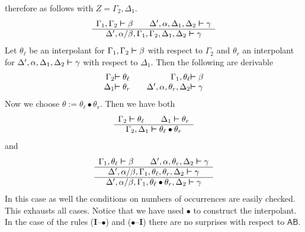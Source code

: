 therefore as follows with $Z = \Gamma_2, \Delta_1$.
\begin{equation}
\begin{array}{c}
\Gamma_1, \Gamma_2 \boldsymbol{\vdash} \beta \qquad \Delta', \alpha,
\Delta_1, \Delta_2 \boldsymbol{\vdash} \gamma \\\hline
\Delta', \alpha/\beta, \Gamma_1, \Gamma_2, \Delta_1,
\Delta_2 \boldsymbol{\vdash} \gamma
\end{array}
\end{equation}
Let $\theta_{\ell}$ be an interpolant for $\Gamma_1, \Gamma_2 %
\bvdash \beta$ with respect to $\Gamma_2$ and $\theta_r$ an
interpolant for $\Delta', \alpha, \Delta_1, \Delta_2 \boldsymbol{\vdash} \gamma$
with respect to $\Delta_1$. Then the following are derivable
\begin{equation}
\begin{array}{r@{}l@{\qquad}r@{}l}
\Gamma_2 & \bvdash \theta_{\ell} & \Gamma_1, \theta_{\ell}
    & \bvdash \beta \\
\Delta_1 & \bvdash \theta_r & \Delta', \alpha, \theta_r, \Delta_2
    & \bvdash \gamma
\end{array}
\end{equation}
Now we choose $\theta := \theta_{\ell} \bullet \theta_r$.
Then we have both
\begin{equation}
\begin{array}{c}
\Gamma_2 \boldsymbol{\vdash} \theta_{\ell} \qquad \Delta_1 \boldsymbol{\vdash} \theta_r
    \\\hline
\Gamma_2, \Delta_1 \boldsymbol{\vdash} \theta_{\ell} \bullet \theta_r
\end{array}
\end{equation}
and
\begin{equation}
\begin{array}{c}
\Gamma_1, \theta_{\ell} \boldsymbol{\vdash} \beta \qquad \Delta', \alpha,
    \theta_r, \Delta_2 \boldsymbol{\vdash} \gamma \\\hline
\Delta', \alpha/\beta, \Gamma_1, \theta_{\ell}, \theta_r,
    \Delta_2 \boldsymbol{\vdash} \gamma \\\hline
\Delta', \alpha/\beta, \Gamma_1, \theta_{\ell} \bullet
    \theta_r, \Delta_2 \boldsymbol{\vdash} \gamma
    \end{array}
\end{equation}
In this case as well the conditions on numbers of occurrences are
easily checked. This exhausts all cases. Notice that we have used
$\bullet$ to construct the interpolant.  In the case of the rules
(\textbf{I}--$\bullet$) and ($\bullet$--\textbf{I}) there are no
surprises with respect to $\mathsf{AB}$.
